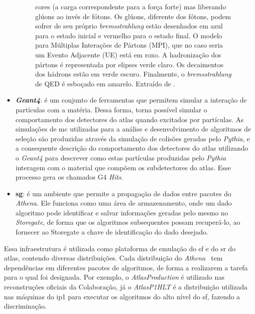 \begin{itemize}
\begin{figure}[b!]
\begin{minipage}{\textwidth}
{{{cores (a carga correspondente para a força forte) mas liberando glúons ao invés
de fótons. Os glúons, diferente dos fótons, podem sofrer de seu próprio
\emph{bremsstrahlung}}}
estão desenhados em azul para o estado inicial e vermelho para o estado
final. O modelo para Múltiplas Interações de Pártons (MPI), que no caso seria um
Evento Adjacente (UE) está em roxo. A hadronização dos pártons é representada
por elipses verde claro. Os decaimentos dos hádrons estão em verde escuro.
Finalmente, o \emph{bremsstrahlung} de QED é esboçado em amarelo.
Extraído de {\cite{mc_event}}.}
\setcounter{footnote}{\value{mpfootnote}}
\end{minipage}
\label{fig:evento_mc}
\end{figure}

\item \textbf{\emph{Geant4}}: é um conjunto de ferramentas que permitem simular a interação de
partículas com a matéria. Dessa forma, torna possível simular o comportamento
dos detectores do \gls{atlas} quando excitados por partículas. As simulações de
\gls{mc} utilizadas para a análise e desenvolvimento de algoritmos de seleção são
produzidas através da simulação de colisões geradas pelo \emph{Pythia}, e a consequente
descrição do comportamento dos detectores do \gls{atlas} utilizando o
\emph{Geant4} para descrever como estas partículas produzidas pelo \emph{Pythia} interagem 
com o material que compõem os subdetectores do \gls{atlas}. Esse processo gera
os chamados G4 \emph{Hits}.
\item \textbf{\gls{sg}}: é um ambiente que permite a propagação de dados entre pacotes do
\emph{Athena}. Ele funciona como uma área de armazenamento, onde um dado algoritmo pode
identificar e salvar informações geradas pelo mesmo no \emph{Storegate}, de forma que
os algoritmos subsequentes possam recuperá-lo, ao fornecer ao Storegate a chave
de identificação do dado desejado.
\end{itemize}

Essa infraestrutura é utilizada como plataforma de emulação do \glsdesc{sf} e do 
\gls{sr} do \gls{atlas}, contendo diversas
distribuições. Cada distribuição do \emph{Athena}~\cite{atlas_computing_tdr} 
tem dependências em diferentes
pacotes de algoritmos, de forma a realizarem a tarefa para o qual foi designada. 
Por exemplo, o \emph{AtlasProduction} é utilizado 
nas reconstruções oficiais da Colaboração, já o \emph{AtlasP1HLT} é a
distribuição utilizada nas máquinas do \gls{ip}1 para executar os algoritmos 
do alto nível do \glsdesc{sf}, fazendo a discriminação. 

